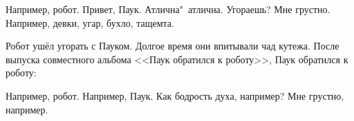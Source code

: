 \begin{dialog}
\X Например, робот.
\R Привет, Паук.
\X Атлична"~атлична. Угораешь?
\R Мне грустно.
\X Например, девки, угар, бухло, тащемта.
\end{dialog}

\begin{monolog}
Робот ушёл угорать с Пауком. Долгое время они впитывали чад кутежа. После выпуска совместного альбома <<Паук обратился к роботу>>,  Паук обратился к роботу:
\end{monolog}

\begin{dialog}
\X Например, робот.
\R Например, Паук.
\X Как бодрость духа, например?
\R Мне грустно, например.
\end{dialog}